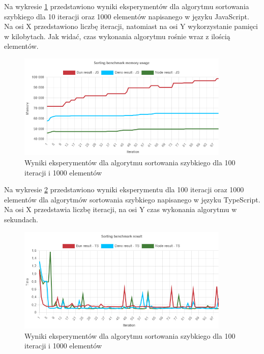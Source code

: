 Na wykresie \ref{fig:radix_sorting_e2_memory_js} przedstawiono wyniki eksperymentów dla algorytmu sortowania szybkiego dla 10 iteracji oraz 1000 elementów napisanego w języku JavaScript. Na osi X przedstawiono liczbę iteracji, natomiast na osi Y wykorzystanie pamięci w kilobytach. Jak widać, czas wykonania algorytmu rośnie wraz z ilością elementów.
\begin{figure}[H]
  \centering
  \includegraphics[width=0.9\textwidth]{Figures/sorting/radix/e2_memory_js.png}
  \caption{Wyniki eksperymentów dla algorytmu sortowania szybkiego dla 100 iteracji i 1000 elementów}
  \label{fig:radix_sorting_e2_memory_js}
\end{figure}

Na wykresie \ref{fig:radix_sorting_e2_ts} przedstawiono wyniki eksperymentu dla 100 iteracji oraz 1000 elementów dla algorytmów sortowania szybkiego napisanego w języku TypeScript. Na osi X przedstawia liczbę iteracji, na osi Y czas wykonania algorytmu w sekundach. 

\begin{figure}[H]
  \centering
  \includegraphics[width=0.9\textwidth]{Figures/sorting/radix/e2_ts.png}
  \caption{Wyniki eksperymentów dla algorytmu sortowania szybkiego dla 100 iteracji i 1000 elementów}
  \label{fig:radix_sorting_e2_ts}
\end{figure}

